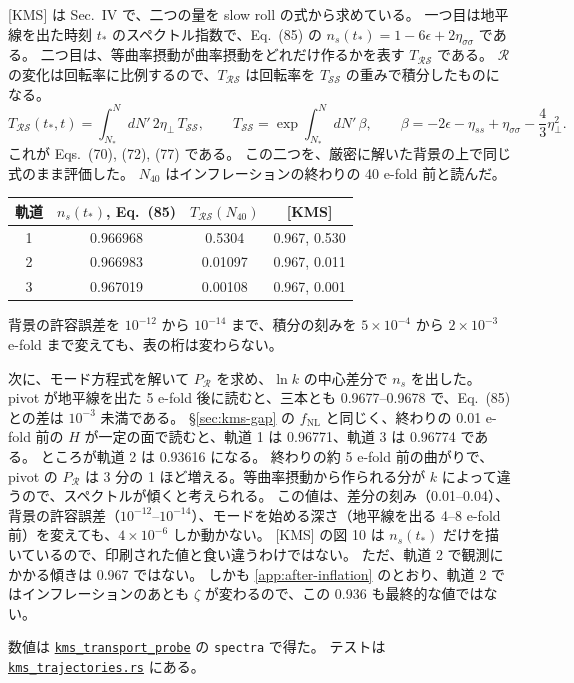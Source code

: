 \documentclass[a4paper,11pt]{ltjsarticle}
\newcommand{\fnl}{f_{\mathrm{NL}}}
\newcommand{\code}[1]{\texttt{#1}}
\newcommand{\repourl}{https://github.com/inuverse44/phys-type-dev}
\begin{document}
[KMS] は Sec.~IV で、二つの量を slow roll の式から求めている\cite{KMS2013}。
一つ目は地平線を出た時刻 $t_*$ のスペクトル指数で、Eq.~(85) の $n_s(t_*)=1-6\epsilon+2\eta_{\sigma\sigma}$ である。
二つ目は、等曲率摂動が曲率摂動をどれだけ作るかを表す $T_{\mathcal{RS}}$ である。
$\mathcal R$ の変化は回転率に比例するので、$T_{\mathcal{RS}}$ は回転率を $T_{\mathcal{SS}}$ の重みで積分したものになる。
\[
T_{\mathcal{RS}}(t_*,t)=\int_{N_*}^{N}dN'\,2\eta_\perp\,T_{\mathcal{SS}},\qquad
T_{\mathcal{SS}}=\exp\int_{N_*}^{N}dN'\,\beta,\qquad
\beta=-2\epsilon-\eta_{ss}+\eta_{\sigma\sigma}-\frac43\eta_\perp^2 .
\]
これが Eqs.~(70), (72), (77) である。
この二つを、厳密に解いた背景の上で同じ式のまま評価した。
$N_{40}$ はインフレーションの終わりの 40 e-fold 前と読んだ。
\begin{center}
\begin{tabular}{cccc}
\toprule
軌道 & $n_s(t_*)$, Eq.~(85) & $T_{\mathcal{RS}}(N_{40})$ & [KMS] \\
\midrule
1 & 0.966968 & 0.5304 & 0.967, 0.530 \\
2 & 0.966983 & 0.01097 & 0.967, 0.011 \\
3 & 0.967019 & 0.00108 & 0.967, 0.001 \\
\bottomrule
\end{tabular}
\end{center}
背景の許容誤差を $10^{-12}$ から $10^{-14}$ まで、積分の刻みを $5\times10^{-4}$ から $2\times10^{-3}$ e-fold まで変えても、表の桁は変わらない。

次に、モード方程式を解いて $P_{\mathcal R}$ を求め、$\ln k$ の中心差分で $n_s$ を出した。
pivot が地平線を出た 5 e-fold 後に読むと、三本とも 0.9677--0.9678 で、Eq.~(85) との差は $10^{-3}$ 未満である。
\S\ref{sec:kms-gap} の $\fnl$ と同じく、終わりの 0.01 e-fold 前の $H$ が一定の面で読むと、軌道 1 は 0.96771、軌道 3 は 0.96774 である。
ところが軌道 2 は 0.93616 になる。
終わりの約 5 e-fold 前の曲がりで、pivot の $P_{\mathcal R}$ は 3 分の 1 ほど増える。等曲率摂動から作られる分が $k$ によって違うので、スペクトルが傾くと考えられる。
この値は、差分の刻み（0.01--0.04）、背景の許容誤差（$10^{-12}$--$10^{-14}$）、モードを始める深さ（地平線を出る 4--8 e-fold 前）を変えても、$4\times10^{-6}$ しか動かない。
[KMS] の図 10 は $n_s(t_*)$ だけを描いているので、印刷された値と食い違うわけではない。
ただ、軌道 2 で観測にかかる傾きは 0.967 ではない。
しかも \ref{app:after-inflation} のとおり、軌道 2 ではインフレーションのあとも $\zeta$ が変わるので、この 0.936 も最終的な値ではない。

数値は \href{\repourl/blob/main/crates/phys-type-models/examples/kms_transport_probe.rs}{\texttt{kms\_transport\_probe}} の \code{spectra} で得た。
テストは \href{\repourl/blob/main/crates/phys-type-models/tests/kms_trajectories.rs}{\texttt{kms\_trajectories.rs}} にある。
\end{document}
